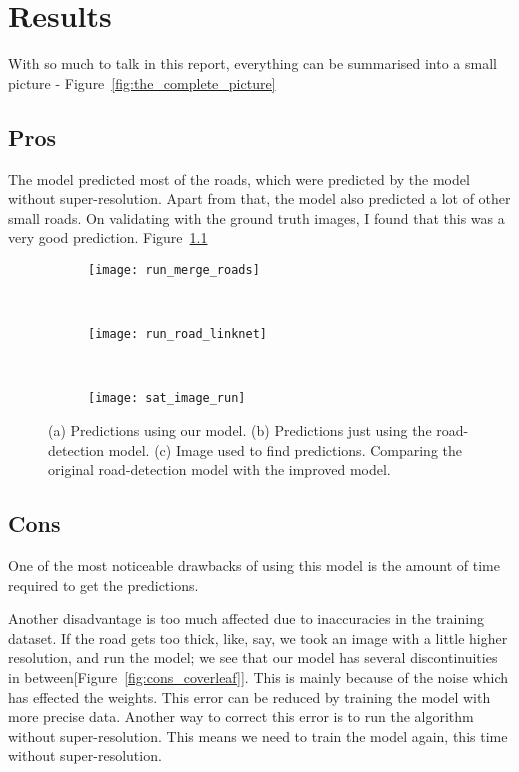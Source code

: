 \chapter{Results}\label{chapt:results}

With so much to talk in this report, everything can be summarised into a small picture - Figure~\ref{fig:the_complete_picture}

\section{Pros}
The model predicted most of the roads, which were predicted by the model without super-resolution. Apart from that, the model also predicted a lot of other small roads. On validating with the ground truth images, I found that this was a very good prediction. Figure~\ref{fig:run_merge_road_maps}

\begin{figure}[h!]
  \centering
  \begin{subfigure}{0.55\textwidth}
    \texttt{[image: run\_merge\_roads]}
    \caption{}
  \end{subfigure}~
  \begin{subfigure}{0.21\textwidth}
    \texttt{[image: run\_road\_linknet]}
    \caption{}
  \end{subfigure}~
  \begin{subfigure}{0.21\textwidth}
    \texttt{[image: sat\_image\_run]}
    \caption{}
  \end{subfigure}
  \caption[Predictions]{(a) Predictions using our model. (b) Predictions just using the road-detection model. (c) Image used to find predictions. Comparing the original road-detection model with the improved model.}
  \label{fig:run_merge_road_maps}
\end{figure}


\section{Cons}
One of the most noticeable drawbacks of using this model is the amount of time required to get the predictions. 

Another disadvantage is too much affected due to inaccuracies in the training dataset. If the road gets too thick, like, say, we took an image with a little higher resolution, and run the model; we see that our model has several discontinuities in between[Figure~\ref{fig:cons_coverleaf}]. 
This is mainly because of the noise which has effected the weights. This error can be reduced by training the model with more precise data. Another way to correct this error is to run the algorithm without super-resolution. This means we need to train the model again, this time without super-resolution.

